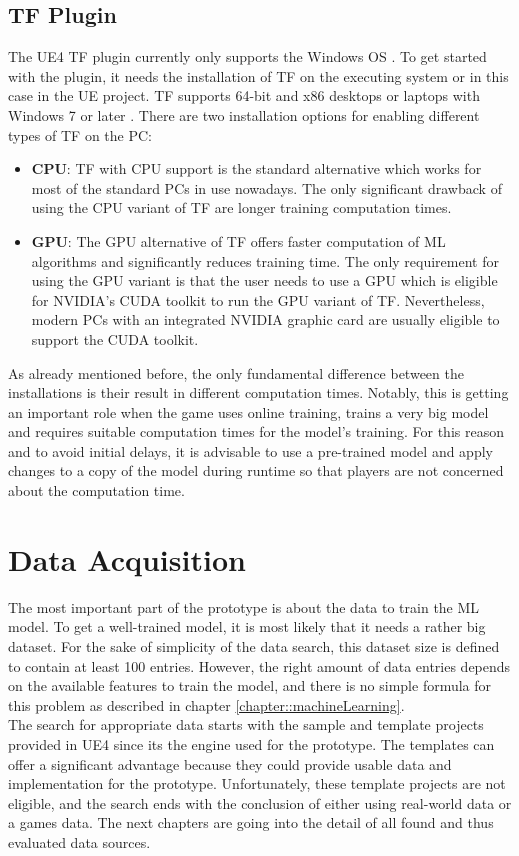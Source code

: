 \documentclass[MGS,Master,english]{twbook}%
\begin{document}
\subsection{\acl{TF} Plugin}
The UE4 \ac{TF} plugin currently only supports the Windows OS \cite{ue4::tensorFlowPlugin}. To get started with the plugin, it needs the installation of \ac{TF} on the executing system or in this case in the UE project. \ac{TF} supports 64-bit and x86 desktops or laptops with Windows 7 or later \cite{api::tensorFlow}. There are two installation options for enabling different types of \ac{TF} on the PC:
\begin{itemize}
	\item \textbf{\ac{CPU}}: \ac{TF} with CPU support is the standard alternative which works for most of the standard PCs in use nowadays. The only significant drawback of using the CPU variant of \ac{TF} are longer training computation times.
	\item \textbf{\ac{GPU}}: The GPU alternative of \ac{TF} offers faster computation of ML algorithms and significantly reduces training time. The only requirement for using the GPU variant is that the user needs to use a GPU which is eligible for NVIDIA's CUDA toolkit \cite{nvidia::cudaToolkit} to run the GPU variant of \ac{TF}. Nevertheless, modern PCs with an integrated NVIDIA graphic card are usually eligible to support the CUDA toolkit. 
\end{itemize}
As already mentioned before, the only fundamental difference between the installations is their result in different computation times. Notably, this is getting an important role when the game uses online training, trains a very big model and requires suitable computation times for the model's training. For this reason and to avoid initial delays, it is advisable to use a pre-trained model and apply changes to a copy of the model during runtime so that players are not concerned about the computation time.

\section{Data Acquisition}
The most important part of the prototype is about the data to train the ML model. To get a well-trained model, it is most likely that it needs a rather big dataset. For the sake of simplicity of the data search, this dataset size is defined to contain at least 100 entries. However, the right amount of data entries depends on the available features to train the model, and there is no simple formula for this problem as described in chapter \ref{chapter::machineLearning}. \\
The search for appropriate data starts with the sample and template projects provided in UE4 since its the engine used for the prototype. The templates can offer a significant advantage because they could provide usable data and implementation for the prototype. Unfortunately, these template projects are not eligible, and the search ends with the conclusion of either using real-world data or a games data. The next chapters are going into the detail of all found and thus evaluated data sources.
\end{document}
